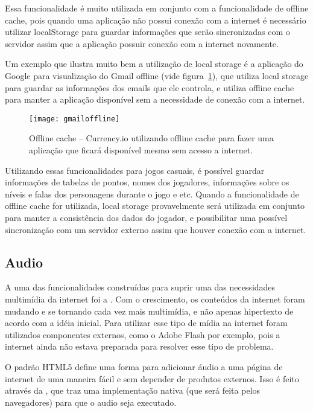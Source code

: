 Essa funcionalidade é muito utilizada em conjunto com a funcionalidade
de offline cache, pois quando uma aplicação não possui conexão com a
internet é necessário utilizar localStorage para guardar informações
que serão sincronizadas com o servidor assim que a aplicação possuir
conexão com a internet novamente.

Um exemplo que ilustra muito bem a utilização de local storage é a
aplicação do Google para visualização do Gmail offline (vide
figura~\ref{img:gmailoffline}), que utiliza local storage para guardar
as informações dos emails que ele controla, e utiliza offline cache
para manter a aplicação disponível sem a necessidade de conexão com a
internet.

\begin{figure}[H]
  \centering
	\texttt{[image: gmailoffline]}
  \caption{Offline cache {--} Currency.io utilizando offline cache
  para fazer uma aplicação que ficará disponível mesmo sem acesso a
  internet.}
  \label{img:gmailoffline}
\end{figure}

Utilizando essas funcionalidades para jogos casuais, é possível
guardar informações de tabelas de pontos, nomes dos jogadores,
informações sobre os níveis e falas dos personagens durante o jogo e
etc. Quando a funcionalidade de offline cache for utilizada, local
storage provavelmente será utilizada em conjunto para manter a
consistência dos dados do jogador, e possibilitar uma possível
sincronização com um servidor externo assim que houver conexão com a
internet.

\subsection{Audio}
A uma das funcionalidades construídas para suprir uma das necessidades multimídia
da internet foi a \tagaudio. Com o crescimento, os conteúdos da internet foram mudando
e se tornando cada vez mais multimídia, e não apenas hipertexto de
acordo com a idéia inicial. Para utilizar esse tipo de mídia na
internet foram utilizados componentes externos, como o Adobe Flash por
exemplo, pois a internet ainda não estava preparada para resolver esse
tipo de problema.

O padrão HTML5 define uma forma para adicionar áudio a uma página de
internet de uma maneira fácil e sem depender de produtos externos.
Isso é feito através da \tagaudio, que traz uma
implementação nativa (que será feita pelos navegadores) para que o
audio seja executado.

